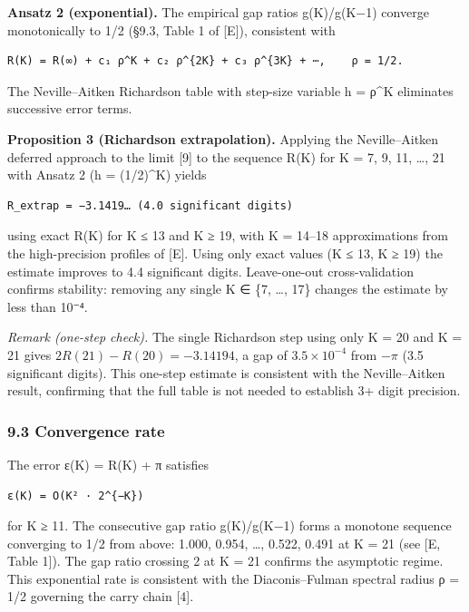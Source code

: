 \documentclass[
  11pt,
]{article}
\begin{document}
\textbf{Ansatz 2 (exponential).} The empirical gap ratios g(K)/g(K−1) converge
monotonically to 1/2 (§9.3, Table 1 of {[}E{]}), consistent with

\begin{verbatim}
R(K) = R(∞) + c₁ ρ^K + c₂ ρ^{2K} + c₃ ρ^{3K} + ⋯,    ρ = 1/2.
\end{verbatim}

The Neville--Aitken Richardson table with step-size variable h = ρ\^{}K
eliminates successive error terms.

\textbf{Proposition 3 (Richardson extrapolation).} Applying the Neville--Aitken
deferred approach to the limit {[}9{]} to the sequence R(K) for K = 7, 9, 11,
\ldots, 21 with Ansatz 2 (h = (1/2)\^{}K) yields

\begin{verbatim}
R_extrap = −3.1419… (4.0 significant digits)
\end{verbatim}

using exact R(K) for K ≤ 13 and K ≥ 19, with K = 14--18 approximations from the
high-precision profiles of {[}E{]}. Using only exact values (K ≤ 13, K ≥ 19) the
estimate improves to 4.4 significant digits. Leave-one-out cross-validation
confirms stability: removing any single K ∈ \{7, \ldots, 17\} changes the
estimate by less than 10⁻⁴.

\emph{Remark (one-step check).} The single Richardson step using only K = 20 and
K = 21 gives \(2R(21) - R(20) = -3.14194\), a gap of \(3.5 \times 10^{-4}\) from
\(-\pi\) (3.5 significant digits). This one-step estimate is consistent with the
Neville--Aitken result, confirming that the full table is not needed to
establish 3+ digit precision.

\subsubsection{9.3 Convergence rate}\label{convergence-rate}

The error ε(K) = \textbar R(K) + π\textbar{} satisfies

\begin{verbatim}
ε(K) = O(K² · 2^{−K})
\end{verbatim}

for K ≥ 11. The consecutive gap ratio g(K)/g(K−1) forms a monotone sequence
converging to 1/2 from above: 1.000, 0.954, \ldots, 0.522, 0.491 at K = 21 (see
{[}E, Table 1{]}). The gap ratio crossing 2 at K = 21 confirms the asymptotic
regime. This exponential rate is consistent with the Diaconis--Fulman spectral
radius ρ = 1/2 governing the carry chain {[}4{]}.
\end{document}
